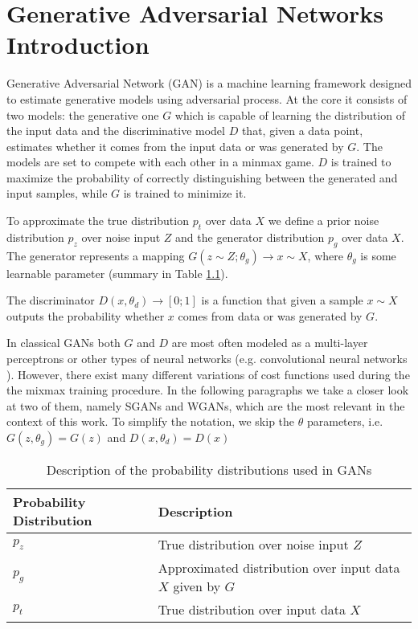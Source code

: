 \chapter{Generative Adversarial Networks Introduction}\label{chapter:gans}
Generative Adversarial Network (GAN)\cite{goodfellow2014generative} is a
machine learning framework designed to estimate generative models using
adversarial process. At the core it consists of two models: the generative one
$G$ which is capable of learning the distribution of the input data and the
discriminative model $D$ that, given a data point, estimates whether it comes
from the input data or was generated by $G$. The models are set to compete with each
other in a minmax game. $D$ is trained to maximize the probability of correctly
distinguishing between the generated and input samples, while $G$ is trained to
minimize it.  

To approximate the true distribution $p_t$ over data $X$ we define a prior noise
distribution $p_z$ over noise input $Z$ and the generator distribution $p_g$
over data $X$. The generator represents a mapping
$G(z \sim Z; \theta_g) \to x \sim X$, where $\theta_g$ is some learnable
parameter (summary in Table \ref{tab:gan_probabilities}).

The discriminator $D(x, \theta_d) \to [0;1]$ is a function that given a sample $x
\sim X$ outputs the probability whether $x$ comes from data or was generated by
$G$. 

In classical GANs both $G$ and $D$ are most often modeled as a multi-layer
perceptrons \cite{goodfellow2014generative} or other types of neural networks
(e.g. convolutional neural networks \cite{radford2016unsupervised}). However,
there exist many different variations of cost functions used during the the mixmax
training procedure. In the following paragraphs we take a closer look at two of
them, namely SGANs and WGANs, which are the most relevant in the context of this
work. To simplify the notation, we skip the $\theta$ parameters, i.e. $G(z,
\theta_g) = G(z)$ and $D(x, \theta_d) = D(x)$
\begin{table}[]
  \centering
  \begin{tabular}{|l|l|}
    \hline
    Probability Distribution & Description  \\ \hline
    $p_z$ & True distribution over noise input $Z$ \\ \hline
    $p_g$&  Approximated distribution over input data $X$ given by $G$ \\ \hline
    $p_t$&  True distribution over input data $X$\\ \hline
  \end{tabular}
  \caption{\label{tab:gan_probabilities} Description of the probability
    distributions used in GANs}
\end{table}

